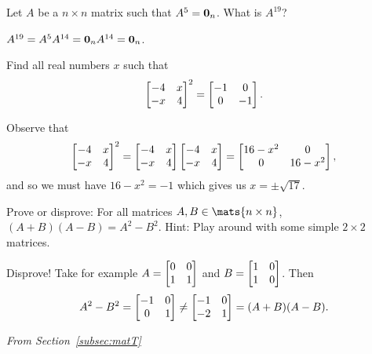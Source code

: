 \begin{requ}
Let $A$ be a $n\times n$ matrix such that $A^5={\bf 0}_n$.
What is $A^{19}$? 
\begin{requanswer} 
$A^{19}=A^5A^{14}={\bf 0}_n A^{14}={\bf 0}_n$.
\end{requanswer}
\end{requ}


\begin{requ}
Find all real numbers $x$ such that  
$$\begin{bmatrix} -4 & x \cr -x & 4
\end{bmatrix}^2 = \begin{bmatrix} -1 & 0 \cr 0 & -1
\end{bmatrix}.$$
\begin{requanswer} Observe that $$
\begin{bmatrix} -4 & x \cr -x & 4
\end{bmatrix}^2 =\begin{bmatrix} -4 & x \cr -x & 4
\end{bmatrix}\begin{bmatrix} -4 & x \cr -x & 4
\end{bmatrix} =  \begin{bmatrix} 16 - x^2 & 0 \cr 0 & 16 - x^2 \end{bmatrix}, $$ and so we must have
$16 - x^2 = -1$ which gives us $x = \pm\sqrt{17}$.
\end{requanswer}
\end{requ}

\begin{requ}
Prove or disprove: For all matrices $A,B\in\mats{n\times n}$,
$(A+B)(A-B) = A^2 - B^2.$
Hint: Play around with some simple $2\times 2$ matrices.
\begin{requanswer}
Disprove! Take for example $A = \begin{bmatrix} 0 & 0 \cr 1 & 1
\cr\end{bmatrix}$ and $B = \begin{bmatrix} 1 & 0 \cr 1 & 0
\cr\end{bmatrix}$. Then $$A^2 - B^2 = \begin{bmatrix} -1 & 0 \cr 0 &
1 \cr\end{bmatrix} \neq  \begin{bmatrix} -1 & 0 \cr -2 & 1
\cr\end{bmatrix}= (A+B)(A-B). $$
\end{requanswer}
\end{requ}


\noindent
{\em From Section~\ref{subsec:matT}}

